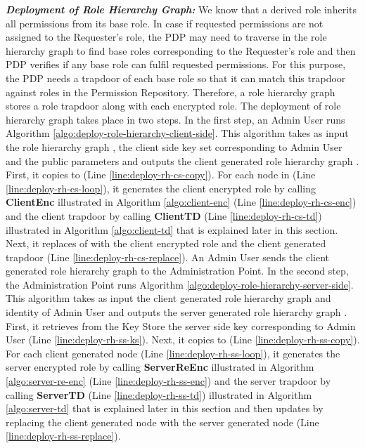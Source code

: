 \documentclass[final,5p,times,twocolumn]{elsarticle}
\begin{document}
\emph{\textbf{Deployment of Role Hierarchy Graph:}} 
We know that a derived role inherits all permissions from its base role. In case if requested permissions are not assigned to the Requester's role, the PDP may need to traverse in the role hierarchy graph to find base roles corresponding to the Requester's role and then PDP verifies if any base role can fulfil requested permissions. For this purpose, the PDP needs a trapdoor of each base role so that it can match this trapdoor against roles in the Permission Repository. Therefore, a role hierarchy graph stores a role trapdoor along with each encrypted role. The deployment of role hierarchy graph takes place in two steps. In the first step, an Admin User runs Algorithm \ref{algo:deploy-role-hierarchy-client-side}. This algorithm takes as input the role hierarchy graph , the client side key set  corresponding to Admin User  and the public parameters  and outputs the client generated role hierarchy graph . First, it copies  to   (Line \ref{line:deploy-rh-cs-copy}). For each node  in  (Line \ref{line:deploy-rh-cs-loop}), it generates the client encrypted role by calling \textbf{ClientEnc} illustrated in Algorithm \ref{algo:client-enc} (Line \ref{line:deploy-rh-cs-enc}) and the client trapdoor by calling \textbf{ClientTD} (Line \ref{line:deploy-rh-cs-td}) illustrated in Algorithm \ref{algo:client-td} that is explained later in this section. Next, it replaces  of  with the client encrypted role and the client generated trapdoor (Line \ref{line:deploy-rh-cs-replace}). An Admin User sends the client generated role hierarchy graph to the Administration Point. 
In the second step, the Administration Point runs Algorithm \ref{algo:deploy-role-hierarchy-server-side}. This algorithm takes as input the client generated role hierarchy graph  and identity of Admin User  and outputs the server generated role hierarchy graph . First, it retrieves from the Key Store the server side key  corresponding to Admin User  (Line \ref{line:deploy-rh-ss-ks}). Next, it copies  to  (Line \ref{line:deploy-rh-ss-copy}). For each client generated node (Line \ref{line:deploy-rh-ss-loop}), it generates the server encrypted role by calling \textbf{ServerReEnc} illustrated in Algorithm \ref{algo:server-re-enc} (Line \ref{line:deploy-rh-ss-enc}) and the server trapdoor by calling \textbf{ServerTD} (Line \ref{line:deploy-rh-ss-td}) illustrated in Algorithm \ref{algo:server-td} that is explained later in this section and then updates  by replacing the client generated node with the server generated node (Line \ref{line:deploy-rh-ss-replace}). 
\end{document}
